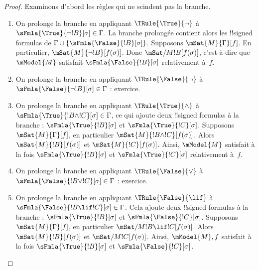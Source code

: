 \documentclass[../../../include/open-logic-section]{subfiles}
\begin{document}
\begin{proof}
Examinons d'abord les règles qui ne scindent pas la branche.
\begin{enumerate}
\item On prolonge la branche en appliquant $\TRule{\True}{\lnot}$ à
  $\sFmla{\True}{\lnot !B}[\sigma] \in \Gamma$. La branche prolongée
  contient alors les !!{signed formula}s de $\Gamma \cup
  \{\sFmla{\False}{!B}[\sigma]\}$. Supposons $\mSat{M}{\Gamma}[f]$.
  En particulier, $\mSat{M}{\lnot !B}[f(\sigma)]$. Donc
  $\mSat/{M}{!B}[f(\sigma)]$, c'est-à-dire que $\mModel{M}$ satisfait
  $\sFmla{\False}{!B}[\sigma]$ relativement à~$f$.
\item On prolonge la branche en appliquant $\TRule{\False}{\lnot}$ à
  $\sFmla{\False}{\lnot !B}[\sigma] \in \Gamma$ : exercice.
\item On prolonge la branche en appliquant $\TRule{\True}{\land}$ à
  $\sFmla{\True}{!B \land !C}[\sigma] \in \Gamma$, ce qui ajoute deux
  !!{signed formula}s à la branche :
  $\sFmla{\True}{!B}[\sigma]$ et $\sFmla{\True}{!C}[\sigma]$. Supposons
  $\mSat{M}{\Gamma}[f]$, en particulier $\mSat{M}{!B \land
    !C}[f(\sigma)]$. Alors $\mSat{M}{!B}[f(\sigma)]$ et
  $\mSat{M}{!C}[f(\sigma)]$. Ainsi, $\mModel{M}$ satisfait à la fois
  $\sFmla{\True}{!B}[\sigma]$ et $\sFmla{\True}{!C}[\sigma]$
  relativement à~$f$.
\item On prolonge la branche en appliquant $\TRule{\False}{\lor}$ à
  $\sFmla{\False}{!B \lor !C}[\sigma] \in \Gamma$ : exercice.
\item On prolonge la branche en appliquant $\TRule{\False}{\lif}$ à
  $\sFmla{\False}{!B \lif !C}[\sigma] \in \Gamma$. Cela ajoute deux
  !!{signed formula}s à la branche : $\sFmla{\True}{!B}[\sigma]$ et
  $\sFmla{\False}{!C}[\sigma]$. Supposons
  $\mSat{M}{\Gamma}[f]$, en particulier
  $\mSat/{M}{!B \lif !C}[f(\sigma)]$. Alors
  $\mSat{M}{!B}[f(\sigma)]$ et
  $\mSat/{M}{!C}[f(\sigma)]$. Ainsi,
  $\mModel{M}, f$ satisfait à la fois
  $\sFmla{\True}{!B}[\sigma]$ et $\sFmla{\False}{!C}[\sigma]$.

\end{enumerate}
\end{proof}
\end{document}
